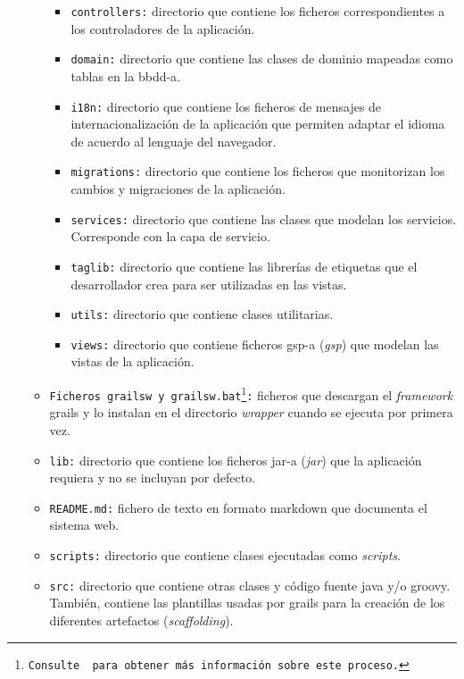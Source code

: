 \documentclass[12pt,a4paper, twoside]{report}
\begin{document}
\begin{itemize}
\begin{itemize}
\begin{itemize}
		    	\item \texttt{controllers:} directorio que contiene los ficheros correspondientes a los controladores de la aplicación.
				\item \texttt{domain:} directorio que contiene las clases de dominio mapeadas como tablas en la \gls{bbdd-a}.
				\item \texttt{i18n:} directorio que contiene los ficheros de mensajes de internacionalización de la aplicación que permiten adaptar el idioma de acuerdo al lenguaje del navegador.
				\item \texttt{migrations:} directorio que contiene los ficheros que monitorizan los cambios y migraciones de la aplicación.
				\item \texttt{services:} directorio que contiene las clases que modelan los servicios. Corresponde con la capa de servicio.
				\item \texttt{taglib:} directorio que contiene las librerías de etiquetas que el desarrollador crea para ser utilizadas en las vistas.
				\item \texttt{utils:} directorio que contiene clases utilitarias.
				\item \texttt{views:} directorio que contiene ficheros \gls{gsp-a} (\textit{\gls{gsp}}) que modelan las vistas de la aplicación.
			\end{itemize}
		
			\item \texttt{Ficheros grailsw y grailsw.bat\footnote{Consulte \cite{grails:wrapper} para obtener más información sobre este proceso.}:} ficheros que descargan el \textit{framework} \gls{grails} y lo instalan en el directorio \textit{wrapper} cuando se ejecuta por primera vez.
			
			\item \texttt{lib:} directorio que contiene los ficheros \gls{jar-a} (\textit{\gls{jar}}) que la aplicación requiera y no se incluyan por defecto.
			\item \texttt{README.md:} fichero de texto en formato \gls{markdown} que documenta el sistema web.
			\item \texttt{scripts:} directorio que contiene clases ejecutadas como \textit{\glspl{script}}.
			\item \texttt{src:} directorio que contiene otras clases y código fuente \gls{java} y/o \gls{groovy}. También, contiene las plantillas usadas por \gls{grails} para la creación de los diferentes artefactos (\textit{\gls{scaffolding}}).
			

\end{itemize}
\end{itemize}
\end{document}
